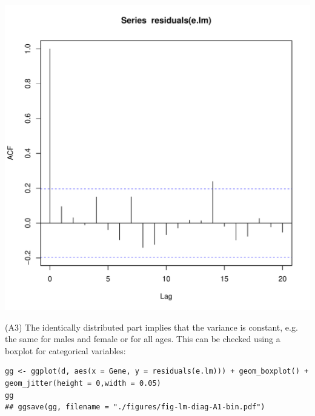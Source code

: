 \documentclass{article}
\begin{document}
\begin{center}
\includegraphics[width=.9\linewidth]{./figures/fig-acf.pdf}
\end{center}

(A3) The identically distributed part implies that the variance is
constant, e.g. the same for males and female or for all ages. This can
be checked using a boxplot for categorical variables:
\lstset{language=r,label= ,caption= ,captionpos=b,numbers=none}
\begin{lstlisting}
gg <- ggplot(d, aes(x = Gene, y = residuals(e.lm))) + geom_boxplot() + geom_jitter(height = 0,width = 0.05)
gg
## ggsave(gg, filename = "./figures/fig-lm-diag-A1-bin.pdf")
\end{lstlisting}
\end{document}
